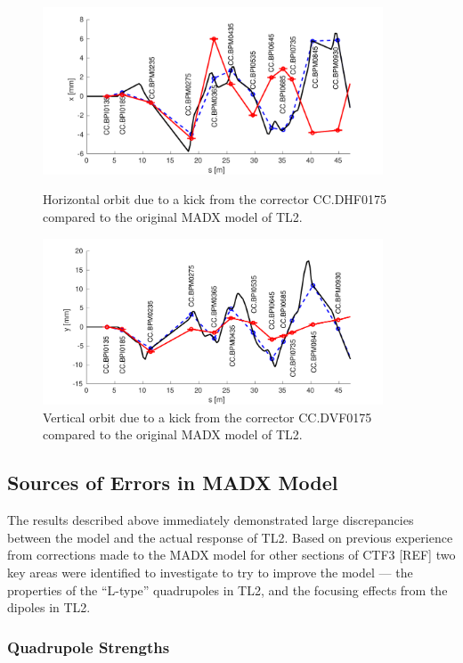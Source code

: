 \begin{figure}
  \centering
  \includegraphics[width=0.9\textwidth]{Figures/optics/modelOriginalH}
  \caption{Horizontal orbit due to a kick from the corrector CC.DHF0175 compared to the original MADX model of TL2.}
  \label{f:modelOriginalH}
  \includegraphics[width=0.9\textwidth]{Figures/optics/modelOriginalV}
  \caption{Vertical orbit due to a kick from the corrector CC.DVF0175 compared to the original MADX model of TL2.}
  \label{f:modelOriginalV}
\end{figure}

\subsection{Sources of Errors in MADX Model}
\label{ss:modelErrorSources}

The results described above immediately demonstrated large discrepancies between the model and the actual response of TL2. Based on previous experience from corrections made to the MADX model for other sections of CTF3 [REF] two key areas were identified to investigate to try to improve the model --- the properties of the ``L-type'' quadrupoles in TL2, and the focusing effects from the dipoles in TL2.

\subsubsection{Quadrupole Strengths}
\label{sss:quadStrengths}

